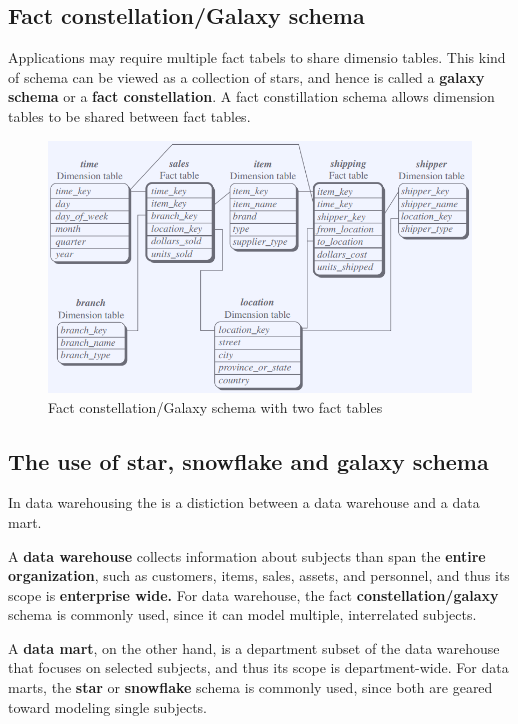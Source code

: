 		\subsection*{Fact constellation/Galaxy schema}

		Applications may require multiple fact tabels to share dimensio tables. This kind of
		schema can be viewed as a collection of stars, and hence is called a {\bf galaxy schema}
		or a {\bf fact constellation}. A fact constillation schema allows dimension tables to
		be shared between fact tables. 

		\begin{figure}[H]
			\centering
			\includegraphics[scale=0.4]{pics/fact.png}
			\caption{Fact constellation/Galaxy schema with two fact tables}
		\end{figure}

		\clearpage
		\subsection*{The use of star, snowflake and galaxy schema}

		In data warehousing the is a distiction between a data warehouse and a data mart. 

		A {\bf data warehouse} collects information about
		subjects than span the {\bf entire organization}, such as customers, items, sales, 
		assets, and personnel, and thus its scope is {\bf enterprise wide.}
		For data warehouse, the fact {\bf constellation/galaxy} schema is commonly used, since it can model
		multiple, interrelated subjects. 

		A {\bf data mart}, on the other hand, is a department subset of the data warehouse that 
		focuses on selected subjects, and thus its scope is department-wide. For data marts, the
		{\bf star} or {\bf snowflake} schema is commonly used, since both are geared toward 
		modeling single subjects.


